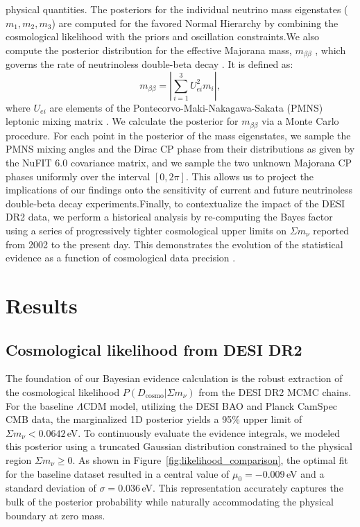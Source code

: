 \documentclass[]{article}
\begin{document}
physical quantities. The posteriors for the individual neutrino mass eigenstates ($m_1, m_2, m_3$) are computed for the favored Normal Hierarchy by combining the cosmological likelihood with the priors and oscillation constraints.We also compute the posterior distribution for the effective Majorana mass, $m_{\beta\beta}$ \citep{benato2015effectivemajoranamassneutrinoless}, which governs the rate of neutrinoless double-beta decay \citep{chakraborty2025highlypredictiveneutrinomodel}. It is defined as:\begin{equation}m_{\beta\beta} = \left| \sum_{i=1}^{3} U_{ei}^2 m_i \right|,\end{equation}where $U_{ei}$ are elements of the Pontecorvo-Maki-Nakagawa-Sakata (PMNS) leptonic mixing matrix  \citep{savla2025classicalreconstructionpmnsmatrix}. We calculate the posterior for $m_{\beta\beta}$ via a Monte Carlo procedure. For each point in the posterior of the mass eigenstates, we sample the PMNS mixing angles and the Dirac CP phase from their distributions as given by the NuFIT 6.0 covariance matrix, and we sample the two unknown Majorana CP phases uniformly over the interval $[0, 2\pi]$. This allows us to project the implications of our findings onto the sensitivity of current and future neutrinoless double-beta decay experiments.Finally, to contextualize the impact of the DESI DR2 data, we perform a historical analysis by re-computing the Bayes factor using a series of progressively tighter cosmological upper limits on $\Sigma m_\nu$ reported from 2002 to the present day. This demonstrates the evolution of the statistical evidence as a function of cosmological data precision  \citep{ong2026bayesianviewdesidr2}.

\section{Results}
\label{sec:results}
\subsection{Cosmological likelihood from DESI DR2}
The foundation of our Bayesian evidence calculation is the robust extraction of the cosmological likelihood $P(D_{\text{cosmo}} | \Sigma m_\nu)$ from the DESI DR2 MCMC chains. For the baseline $\Lambda$CDM model, utilizing the DESI BAO and Planck CamSpec CMB data, the marginalized 1D posterior yields a 95\% upper limit of $\Sigma m_\nu < 0.0642$\,eV. To continuously evaluate the evidence integrals, we modeled this posterior using a truncated Gaussian distribution constrained to the physical region $\Sigma m_\nu \geq 0$. As shown in Figure~\ref{fig:likelihood_comparison}, the optimal fit for the baseline dataset resulted in a central value of $\mu_0 = -0.009$\,eV and a standard deviation of $\sigma = 0.036$\,eV. This representation accurately captures the bulk of the posterior probability while naturally accommodating the physical boundary at zero mass.
\end{document}
